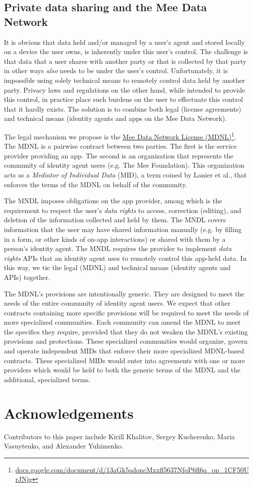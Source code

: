 \documentclass[11pt, oneside]{article}   	%
\newcommand{\hyperfootnote}[1][]{\def\ArgI{{#1}}\hyperfootnoteRelay}
\newcommand\hyperfootnoteRelay[2][]{\href{#1#2}{\ArgI}\footnote{\href{#1#2}{#2}}}
\begin{document}
\subsection{Private data sharing and the Mee Data Network}

It is obvious that data held and/or managed by a user's agent and stored locally on a device the user owns, is inherently under this user's control. The challenge is that data that a user shares with another party or that is collected by that party in other ways \emph{also} needs to be under the user's control. Unfortunately, it is impossible using solely technical means to remotely control data held by another party. Privacy laws and regulations on the other hand, while intended to provide this control, in practice place such burdens on the user to effectuate this control that it hardly exists. The solution is to combine both legal (license agreements) and technical means (identity agents and apps on the Mee Data Network). 

The legal mechanism we propose is the \hyperfootnote[Mee Data Network License (MDNL)][https://]{docs.google.com/document/d/13aGk5adoncMxxfl5637NfqP6fl6q\_op\_1CF50UrJNjg}. The MDNL is a pairwise contract between two parties. The first is the service provider providing an app. The second is an organization that represents the community of identity agent users (e.g. The Mee Foundation). This organization acts as a \emph{Mediator of Individual Data} (MID), a term coined by Lanier et al.\cite{Lanier2018}, that enforces the terms of the MDNL on behalf of the community. 

The MNDL imposes obligations on the app provider, among which is the requirement to respect the user's \emph{data rights} to access, correction (editing), and deletion of the information collected and held by them. The MNDL covers information that the user may have shared information manually (e.g. by filling in a form, or other kinds of on-app interactions) or shared with them by a person's identity agent. The MNDL requires the provider to implement \emph{data rights} APIs that an identity agent uses to remotely control this app-held data. In this way, we tie the legal (MDNL) and technical means (identity agents and APIs) together.

The MDNL's provisions are intentionally generic. They are designed to meet the needs of the entire community of identity agent users. We expect that other contracts containing more specific provisions will be required to meet the needs of more specialized communities. Each community can amend the MDNL to meet the specifics they require, provided that they do not weaken the MDNL's existing provisions and protections. These specialized communities would organize, govern and operate independent MIDs that enforce their more specialized MDNL-based contracts. These specialized MIDs would enter into agreements with one or more providers which would be held to both the generic terms of the MDNL and the additional, specialized terms.

\section{Acknowledgements}
Contributors to this paper include Kirill Khalitov, Sergey Kucherenko, Maria Vasuytenko, and Alexander Yuhimenko.



\end{document}
